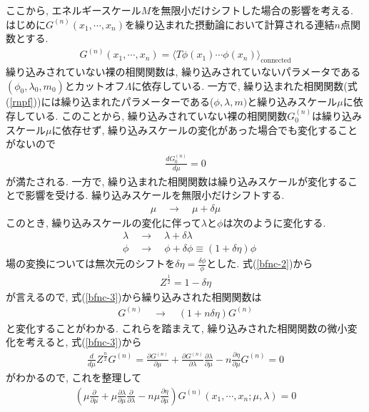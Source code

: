 ここから, エネルギースケール$M$を無限小だけシフトした場合の影響を考える.
はじめに$G^{(n)}(x_1,\cdots,x_n)$を繰り込まれた摂動論において計算される連結$n$点関数とする.
\begin{align}
  G^{(n)}(x_1,\cdots,x_n) = \langle T\phi(x_1)\cdots\phi(x_n) \rangle_{\text{connected}}\label{rnpf}
\end{align}
繰り込みされていない裸の相関関数は, 繰り込みされていないパラメータである$(\phi_0,\lambda_0,m_0)$とカットオフ$\Lambda$に依存している.
一方で, 繰り込まれた相関関数(式(\ref{rnpf}))には繰り込まれたパラメーターである($\phi,\lambda,m)$と繰り込みスケール$\mu$に依存している.
このことから, 繰り込みされていない裸の相関関数$G^{(n)}_0$は繰り込みスケール$\mu$に依存せず, 繰り込みスケールの変化があった場合でも変化することがないので
\begin{align}
  \frac{d G_0^{(n)}}{d\mu} = 0 \label{bfnc-3}
\end{align}
が満たされる.
一方で, 繰り込まれた相関関数は繰り込みスケールが変化することで影響を受ける.
繰り込みスケールを無限小だけシフトする.
\begin{align}
  \mu\quad\rightarrow\quad \mu + \delta \mu \label{sftM}
\end{align}
このとき, 繰り込みスケールの変化に伴って$\lambda$と$\phi$は次のように変化する.
\begin{align}
  &\lambda \quad\rightarrow\quad \lambda + \delta \lambda \label{sftl}\\
  &\phi \quad\rightarrow\quad \phi+ \delta\phi \equiv (1+\delta\eta)\phi \label{sftp}
\end{align}
場の変換については無次元のシフトを$\delta \eta  = \frac{\delta\phi}{\phi}$とした.
式(\ref{bfnc-2})から
\begin{align}
  Z^{\frac{1}{2}} = 1 - \delta\eta\label{bfnc-4}
\end{align}
が言えるので, 式(\ref{bfnc-3})から繰り込みされた相関関数は
\begin{align}
  G^{(n)}\quad\rightarrow\quad(1+n\delta\eta)G^{(n)}\label{sftg}
\end{align}
と変化することがわかる.
これらを踏まえて, 繰り込みされた相関関数の微小変化を考えると, 式(\ref{bfnc-3})から
\begin{align}
  \frac{d}{d\mu} Z^{\frac{n}{2}}G^{(n)} = \frac{\partial G^{(n)}}{\partial \mu} + \frac{\partial G^{(n)}}{\partial \lambda}\frac{\partial \lambda}{\partial \mu} - n \frac{\partial \eta}{\partial \mu}G^{(n)} = 0
\end{align}
がわかるので, これを整理して
\begin{align}
  \left(\mu \frac{\partial}{\partial \mu} + \mu\frac{\partial \lambda}{\partial \mu} \frac{\partial}{\partial \lambda} -n\mu\frac{\partial \eta}{\partial \mu}\right)G^{(n)}(x_1,\cdots,x_n;\mu,\lambda) = 0\label{CS-1}
\end{align}

